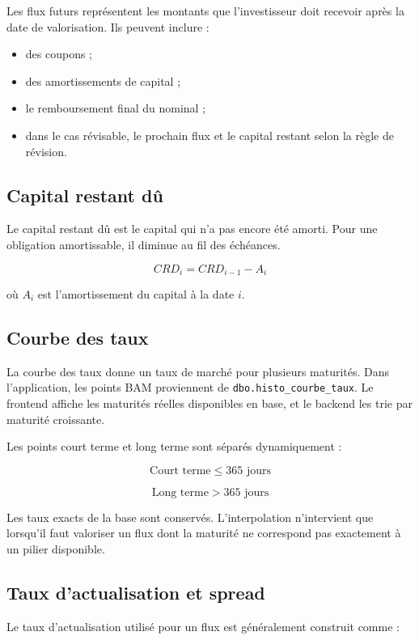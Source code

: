 \documentclass[12pt,a4paper]{article}
\begin{document}
Les flux futurs représentent les montants que l'investisseur doit recevoir après la date de valorisation. Ils peuvent inclure :

\begin{itemize}
    \item des coupons ;
    \item des amortissements de capital ;
    \item le remboursement final du nominal ;
    \item dans le cas révisable, le prochain flux et le capital restant selon la règle de révision.
\end{itemize}

\subsection{Capital restant dû}

Le capital restant dû est le capital qui n'a pas encore été amorti. Pour une obligation amortissable, il diminue au fil des échéances.

\[
CRD_i = CRD_{i-1} - A_i
\]

où $A_i$ est l'amortissement du capital à la date $i$.

\subsection{Courbe des taux}

La courbe des taux donne un taux de marché pour plusieurs maturités. Dans l'application, les points BAM proviennent de \texttt{dbo.histo\_courbe\_taux}. Le frontend affiche les maturités réelles disponibles en base, et le backend les trie par maturité croissante.

Les points court terme et long terme sont séparés dynamiquement :

\[
\text{Court terme} \leq 365 \text{ jours}
\]

\[
\text{Long terme} > 365 \text{ jours}
\]

Les taux exacts de la base sont conservés. L'interpolation n'intervient que lorsqu'il faut valoriser un flux dont la maturité ne correspond pas exactement à un pilier disponible.

\subsection{Taux d'actualisation et spread}

Le taux d'actualisation utilisé pour un flux est généralement construit comme :
\end{document}
